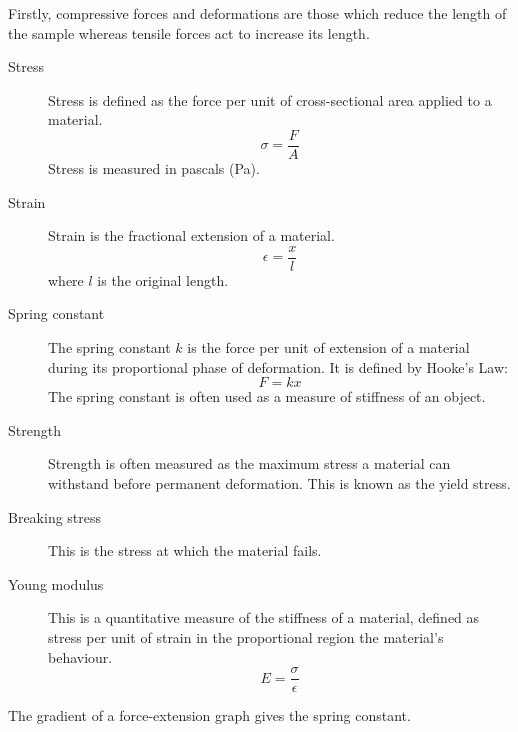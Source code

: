 \documentclass[revision-guide.tex]{subfiles}
\begin{document}

Firstly, compressive forces and deformations are those which reduce the length of the sample whereas tensile forces act to increase its length.

\begin{description}
    \item[Stress] Stress is defined as the force per unit of cross-sectional area applied to a material. \[ \sigma = \frac{F}{A} \] Stress is measured in pascals (Pa).
    \item[Strain] Strain is the fractional extension of a material. \[ \epsilon = \frac{x}{l} \]
    where $l$ is the original length.
    \item[Spring constant] The spring constant $k$ is the force per unit of extension of a material during its proportional phase of deformation. It is defined by Hooke's Law: \[ F = kx\] The spring constant is often used as a measure of stiffness of an object.
    \item[Strength] Strength is often measured as the maximum stress a material can withstand before permanent deformation. This is known as the yield stress.
    \item[Breaking stress] This is the stress at which the material fails.
    \item[Young modulus] This is a quantitative measure of the stiffness of a material, defined as stress per unit of strain in the proportional region the material's behaviour. \[ E = \frac{\sigma}{\epsilon} \]
\end{description}


The gradient of a force-extension graph gives the spring constant.
\end{document}
